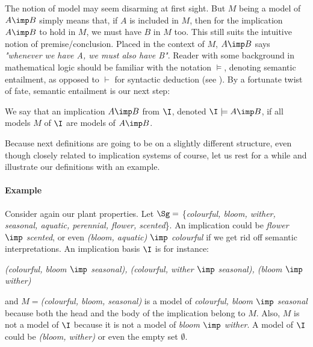 \noindent The notion of model may seem disarming at first sight. But $M$ being
a model of $A \imp B$ simply means that, if $A$ is included in $M$, then for
the implication $A \imp B$ to hold in $M$, we must have $B$ in $M$ too. This 
still suits the intuitive notion of premise/conclusion. Placed in the context
of $M$, $A \imp B$ says \textit{"whenever we have A, we must also have B"}.
Reader with some background in mathematical logic should be familiar with the
notation $\models$, denoting semantic entailment, as opposed to $\vdash$ for
syntactic deduction (see \cite{cori_mathematical_2000}). By a fortunate twist of
fate, semantic entailment is our next step:

\begin{definition} We say that an implication 
	$A \imp B$  from $\I$, denoted $\I \models A 
	\imp 
	B$, if all models $M$ of $\I$ are models of $A \imp B$.
	
\end{definition} 

\noindent Because next definitions are going to be on a slightly different 
structure, even though closely related to implication systems of course, let us
rest for a while and illustrate our definitions with an example.

\vspace{1.2em}

\paragraph{Example} Consider again our plant properties. Let $\Sg = $ 
\{\textit{colourful, bloom, wither, seasonal, aquatic, perennial, flower, 
	scented}\}. An implication could be \textit{flower $\imp$ scented}, or even
\textit{(bloom, aquatic) $\imp$ colourful} if we get rid off semantic 
interpretations. An implication basis $\I$ is for instance:

\begin{center}
	\textit{(colourful, bloom $\imp$ seasonal), (colourful, wither $\imp$ 
		seasonal), (bloom $\imp$ wither)}
\end{center}

\noindent and $M = $\textit{(colourful, bloom, seasonal)} is a model of 
\textit{colourful, bloom $\imp$ seasonal} because both the head and the body
of the implication belong to $M$. Also, $M$ is not a model of $\I$ because it
is not a model of \textit{bloom $\imp$ wither}. A model of $\I$ could be 
\textit{(bloom, wither)} or even the empty set $\emptyset$.

